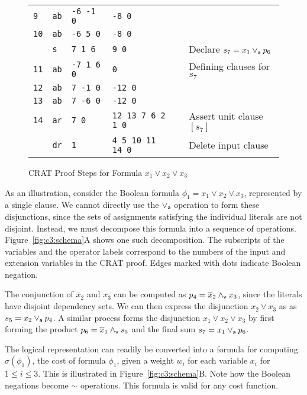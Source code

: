 \documentclass{llncs}
\newcommand{\pand}{\mathbin{\land_{\sf v}}}
\newcommand{\por}{\mathbin{\lor_{\sf a}}}
\newcommand{\obar}[1]{\overline{#1}}
\newcommand{\oneminus}{{\sim}}
\newcommand{\cost}{\sigma}
\begin{document}
\begin{figure}
{\begin{tabular}{llllll}
    {\tt 9} & {\tt ab}  & {\tt -6 -1 0}    & {\tt -8 0} & &  \\  %
    {\tt 10} & {\tt ab}  & {\tt -6 5 0}    & {\tt -8 0} & &  \\  %
             & {\tt s}   & {\tt 7 1 6}   & {\tt 9 0}  & & Declare $s_7 = x_1 \por p_6$ \\
    {\tt 11} & {\tt ab}  & {\tt -7 1 6 0}  & {\tt 0}    & & Defining clauses for $s_7$ \\ 
    {\tt 12} & {\tt ab}  & {\tt  7 -1 0}    & {\tt -12 0} & &  \\  %
    {\tt 13} & {\tt ab}  & {\tt  7 -6 0}    & {\tt -12 0} & &  \\  %
    {\tt 14} & {\tt ar}  & {\tt 7 0} & {\tt 12 13 7 6 2 1 0} & & Assert unit clause $[s_7]$ \\
             & {\tt dr}  & {\tt 1}  & {\tt 4 5 10 11 14 0} & & Delete input clause \\
  \end{tabular}
  }
  \caption{CRAT Proof Steps for Formula $x_1 \lor x_2 \lor x_3$}
  \label{fig:c3:crat}
\end{figure}
    
As an illustration, consider the Boolean formula
$\phi_1 = x_1 \lor x_2 \lor x_3$,
represented by a single clause.  We cannot directly use the
$\por$ operation to form these disjunctions, since the sets of assignments
satisfying the individual literals are not disjoint.  Instead, we must
decompose this formula into a sequence of operations.
Figure~\ref{fig:c3:schema}A shows one such decomposition.
The subscripts of the variables and the operator labels correspond to
the numbers of the input and extension variables in the CRAT proof.
Edges marked with dots indicate Boolean negation.

The conjunction of $\obar{x}_2$ and $x_3$ can be computed as $p_4 =
\obar{x}_2 \pand x_3$, since the literals have disjoint dependency
sets. We can then express the disjunction $x_2 \lor x_3$ as
as $s_5 = x_2 \por p_4$.  A similar process forms the
disjunction $x_1 \lor x_2 \lor x_3$ by first forming the product $p_6
= \obar{x}_1 \pand s_5$ and the final sum $s_7 = x_1 \por p_6$.

The logical representation can readily be converted into a formula for
computing $\cost(\phi_1)$, the cost of formula $\phi_1$, given a weight
$w_i$ for each variable $x_i$ for $1 \leq i \leq 3$.  This is
illustrated in Figure~\ref{fig:c3:schema}B\@.  Note how the Boolean
negations become $\oneminus$ operations.  This formula is valid for
any cost function.
\end{document}
